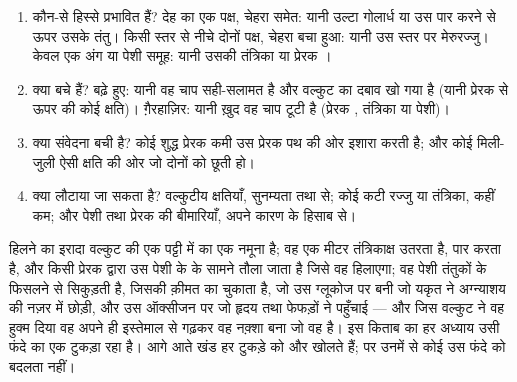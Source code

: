\begin{method}\label{met:g12:brain-and-movement:locate}
\begin{enumerate}
  \item कौन-से हिस्से प्रभावित हैं? देह का एक पक्ष, चेहरा समेत: यानी उल्टा
        गोलार्ध या उस पार करने से ऊपर उसके तंतु। किसी स्तर से नीचे दोनों
        पक्ष, चेहरा बचा हुआ: यानी उस स्तर पर मेरुरज्जु। केवल एक अंग या
        पेशी समूह: यानी उसकी तंत्रिका या प्रेरक ।
  \item क्या  बचे हैं? बढ़े हुए: यानी वह चाप सही-सलामत है और
        वल्कुट का दबाव खो गया है (यानी प्रेरक  से ऊपर की कोई
        क्षति)। ग़ैरहाज़िर: यानी ख़ुद वह चाप टूटी है (प्रेरक ,
        तंत्रिका या पेशी)।
  \item क्या संवेदना बची है? कोई शुद्ध प्रेरक कमी उस प्रेरक पथ की ओर इशारा
        करती है; और कोई मिली-जुली ऐसी क्षति की ओर जो दोनों को छूती हो।
  \item क्या लौटाया जा सकता है? वल्कुटीय क्षतियाँ, सुनम्यता तथा 
        से; कोई कटी रज्जु या तंत्रिका, कहीं कम; और पेशी तथा प्रेरक 
        की बीमारियाँ, अपने कारण के हिसाब से।
\end{enumerate}
\end{method}

\begin{remark}[इस साल का आख़िरी फंदा]\label{rem:g12:brain-and-movement:loop}
हिलने का इरादा वल्कुट की एक पट्टी में  का एक नमूना है; वह एक
मीटर तंत्रिकाक्ष उतरता है, पार करता है, और किसी प्रेरक  द्वारा उस
पेशी के  के सामने तौला जाता है जिसे वह हिलाएगा; वह पेशी तंतुकों के
फिसलने से सिकुड़ती है, जिसकी क़ीमत  का  चुकाता है, जो उस
ग्लूकोज पर बनी जो यकृत ने अग्न्याशय की नज़र में छोड़ी, और उस ऑक्सीजन पर जो
हृदय तथा फेफड़ों ने पहुँचाई --- और जिस वल्कुट ने वह हुक्म दिया वह अपने ही
इस्तेमाल से गढ़कर वह नक़्शा बना जो वह है। इस किताब का हर अध्याय उसी फंदे का
एक टुकड़ा रहा है। आगे आते खंड हर टुकड़े को और खोलते हैं; पर उनमें से कोई उस
फंदे को बदलता नहीं।
\end{remark}

